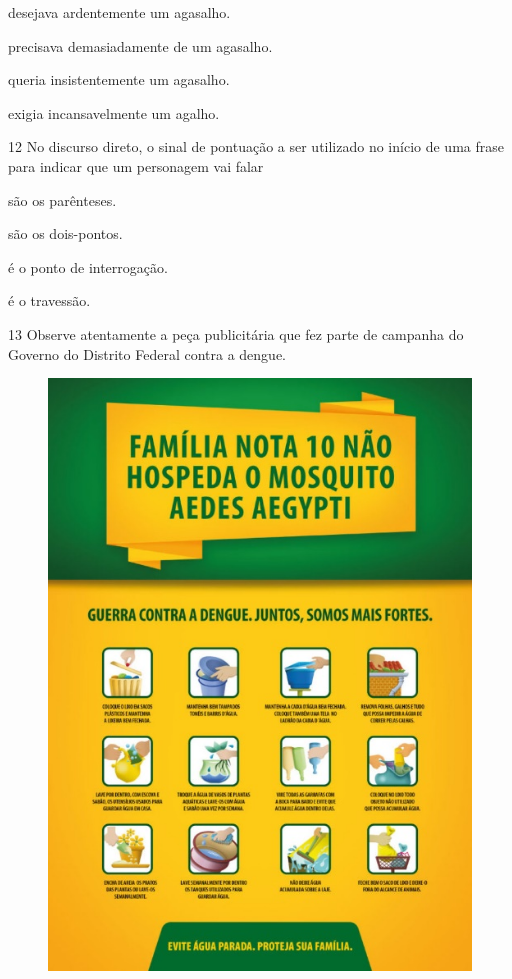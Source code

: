 \begin{escolha}
\item desejava ardentemente um agasalho.

\item precisava demasiadamente de um agasalho.

\item queria insistentemente um agasalho.

\item exigia incansavelmente um agalho.
\end{escolha}



\num{12} No discurso direto, o sinal de pontuação a ser utilizado no início
de uma frase para indicar que um personagem vai falar

\begin{escolha}
\item são os parênteses.

\item são os dois-pontos.

\item é o ponto de interrogação.

\item é o travessão.
\end{escolha}


\pagebreak
\num{13} Observe atentamente a peça publicitária que fez parte de campanha do
Governo do Distrito Federal contra a dengue.

\begin{figure}[htpb!]
\centering
\includegraphics[width=.5\textwidth]{./media/simulados/image2.jpeg}
\end{figure}

